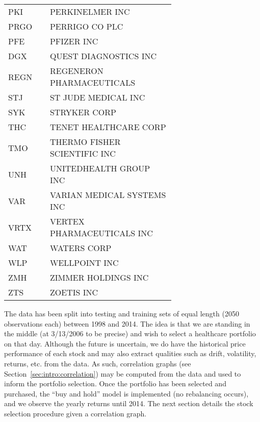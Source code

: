 \begin{longtable}{p{0.15\linewidth} p{0.5\linewidth}}
	PKI & PERKINELMER INC \\
	PRGO & PERRIGO CO PLC \\
	PFE & PFIZER INC \\
	DGX & QUEST DIAGNOSTICS INC \\
	REGN & REGENERON PHARMACEUTICALS \\
	STJ & ST JUDE MEDICAL INC \\
	SYK & STRYKER CORP \\
	THC & TENET HEALTHCARE CORP \\
	TMO & THERMO FISHER SCIENTIFIC INC \\
	UNH & UNITEDHEALTH GROUP INC \\
	VAR & VARIAN MEDICAL SYSTEMS INC \\
	VRTX & VERTEX PHARMACEUTICALS INC \\
	WAT & WATERS CORP \\
	WLP & WELLPOINT INC \\
	ZMH & ZIMMER HOLDINGS INC \\
	ZTS & ZOETIS INC \\
	
\end{longtable}
\bodyspacing

The data has been split into testing and training sets of equal length (2050 
observations each) between 1998 and 2014. The idea is that we are standing 
in the middle (at 3/13/2006 to be precise) and wish to select a healthcare 
portfolio on that day. Although the future is uncertain, we do have the 
historical price performance of each stock and may also extract qualities such 
as drift, volatility, returns, etc. from the data. As such, correlation graphs 
(see Section~\ref{sec:intro:correlation}) may be computed from the data and 
used to inform the portfolio selection. Once the portfolio has been 
selected and purchased, the ``buy and hold'' model is implemented (no 
rebalancing occurs), and we observe the yearly returns until 2014. The next 
section details the stock selection procedure given a correlation graph.
